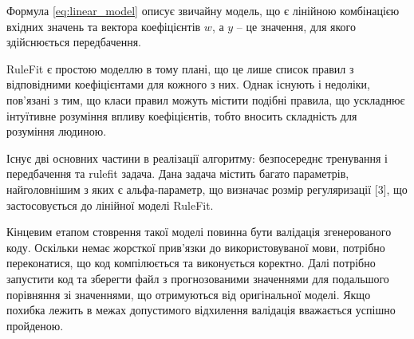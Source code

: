 Формула \ref{eq:linear_model} описує звичайну модель, що є лінійною комбінацією вхідних значень та вектора коефіцієнтів $w$, а  $y$ – це значення, для якого здійснюється передбачення.

RuleFit є простою моделлю в тому плані, що це лише список правил з відповідними коефіцієнтами для кожного з них. Однак існують і недоліки, пов'язані з тим, що класи правил можуть містити подібні правила, що ускладнює інтуїтивне розуміння впливу коефіцієнтів, тобто вносить складність для розуміння людиною.

Існує дві основних частини в реалізації алгоритму: безпосереднє тренування і передбачення та rulefit задача. Дана задача містить багато параметрів, найголовнішим з яких є альфа-параметр, що визначає розмір регуляризації [3], що застосовується до лінійної моделі RuleFit.

Кінцевим етапом стоврення такої моделі повинна бути валідація згенерованого коду. Оскільки немає жорсткої прив’язки до використовуваної мови, потрібно переконатися, що код компілюється та виконується коректно. Далі потрібно запустити код та зберегти файл з прогнозованими значеннями для подальшого порівняння зі значеннями, що отримуються від оригінальної моделі. Якщо похибка лежить в межах допустимого відхилення валідація вважається успішно пройденою.

